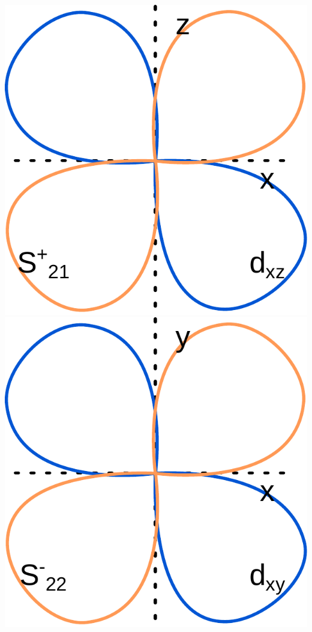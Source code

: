 \documentclass[french]{yLectureNote}
\begin{document}
\includegraphics[scale=0.5]{s+21}
\includegraphics[scale=0.5]{s-22}
\end{document}
